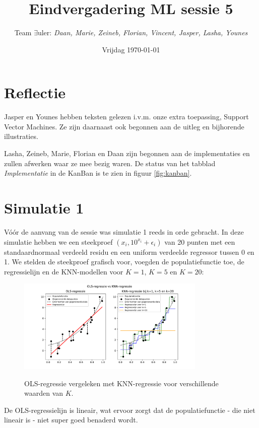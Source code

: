 \documentclass{article}
\title{Eindvergadering ML sessie 5}
\author{Team $\exists$uler: \textit{Daan, Marie, Zeineb, Florian, Vincent, Jasper, Lasha, Younes}}
\date{Vrijdag \today}
\begin{document}
	
\maketitle

\section*{Reflectie}

Jasper en Younes hebben teksten gelezen i.v.m. onze extra toepassing, Support Vector Machines. Ze zijn daarnaast ook begonnen aan de uitleg en bijhorende illustraties.

 Lasha, Zeineb, Marie, Florian en Daan zijn begonnen aan de implementaties en zullen afwerken waar ze mee bezig waren. De status van het tabblad \textit{Implementatie} in de KanBan is te zien in figuur \ref{fig:kanban}.
 
 \section*{Simulatie 1}
 
 Vóór de aanvang van de sessie was simulatie 1 reeds in orde gebracht.
In deze simulatie hebben we een steekproef \((x_i, 10^{x_i} + \epsilon_i)\) van 20 punten met een standaardnormaal verdeeld residu en een uniform verdeelde regressor tussen 0 en 1. We stelden de steekproef grafisch voor, voegden de populatiefunctie toe, de regressielijn en de KNN-modellen voor \(K=1\), \(K=5\) en \(K=20\):

\begin{figure}[h!]
	\centering
	\includegraphics[width=0.8\textwidth]{simulatie1}
	\label{fig:simulatie1}
	\caption{OLS-regressie vergeleken met KNN-regressie voor verschillende waarden van \(K\).}
\end{figure}

De OLS-regressielijn is lineair, wat ervoor zorgt dat de populatiefunctie - die niet lineair is - niet super goed benaderd wordt.
\end{document}
